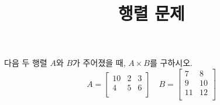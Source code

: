 \documentclass{article}
\begin{document}
    \title{행렬 문제}

    다음 두 행렬 \( A \)와 \( B \)가 주어졌을 때, \( A \times B \)를 구하시오.  
          \[
          A = \begin{bmatrix}
          10 & 2 & 3 \\
          4 & 5 & 6 \\
          \end{bmatrix}
          \quad
          B = \begin{bmatrix}
          7 & 8 \\
          9 & 10 \\
          11 & 12 \\
          \end{bmatrix}
          \]
    
\end{document}
